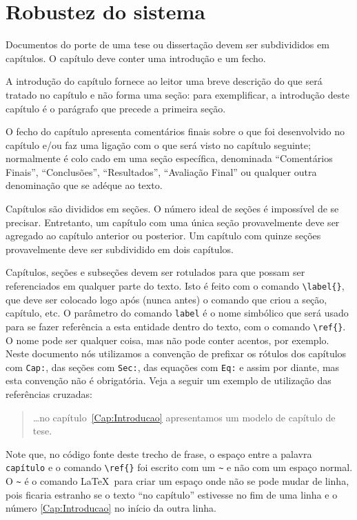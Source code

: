 \section{Robustez do sistema}
\label{RobustezSistema}

Documentos do porte de uma tese ou dissertação devem ser subdivididos
em capítulos. O capítulo deve conter uma introdução e um fecho.

A introdução do capítulo fornece ao leitor uma breve descrição do que
será tratado no capítulo e não forma uma seção: para exemplificar, a
introdução deste capítulo é o parágrafo que precede a primeira seção.

O fecho do capítulo apresenta comentários finais sobre o que foi
desenvolvido no capítulo e/ou faz uma ligação com o que será visto no
capítulo seguinte; normalmente é colo cado em uma seção específica,
denominada ``Comentários Finais'', ``Conclusões'', ``Resultados'',
``Avaliação Final'' ou qualquer outra denominação que se adéque ao
texto.

Capítulos são divididos em seções. O número ideal de seções é
impossível de se precisar. Entretanto, um capítulo com uma única seção
provavelmente deve ser agregado ao capítulo anterior ou posterior. Um
capítulo com quinze seções provavelmente deve ser subdividido em dois
capítulos.

Capítulos, seções e subseções devem ser rotulados para que possam ser
referenciados em qualquer parte do texto.  Isto é feito com o comando
\verb|\label{}|, que deve ser colocado logo após (nunca antes) o
comando que criou a seção, capítulo, etc. O parâmetro do comando
\texttt{label} é o nome simbólico que será usado para se fazer
referência a esta entidade dentro do texto, com o comando
\verb|\ref{}|. O nome pode ser qualquer coisa, mas não pode conter
acentos, por exemplo. Neste documento nós utilizamos a convenção de
prefixar os rótulos dos capítulos com \texttt{Cap:}, das seções com
\texttt{Sec:}, das equações com \texttt{Eq:} e assim por diante, mas
esta convenção não é obrigatória. Veja a seguir um exemplo de
utilização das referências cruzadas:
\begin{quotation}
\dots no capítulo~\ref{Cap:Introducao} apresentamos um modelo de
capítulo de tese.
\end{quotation}
Note que, no código fonte deste trecho de frase, o espaço entre a palavra
\texttt{capítulo} e o comando \verb|\ref{}| foi escrito com
um \texttt{\~{}} e não com um espaço normal. O \texttt{\~{}} é o
comando \LaTeX\ para criar um espaço onde não se pode mudar de linha,
pois ficaria estranho se o texto ``no capítulo'' estivesse no fim de
uma linha e o número \ref{Cap:Introducao} no início da outra linha.

